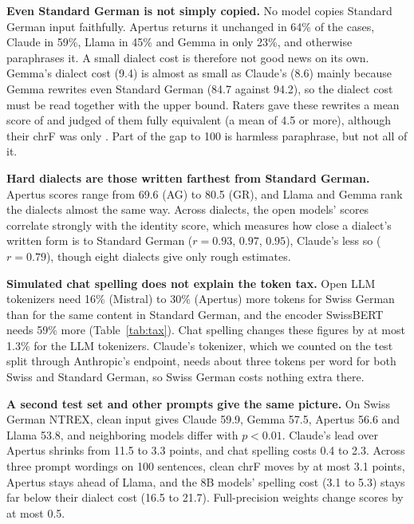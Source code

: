 \documentclass[11pt]{article}
\begin{document}
\textbf{Even Standard German is not simply copied.} No model copies Standard German input faithfully.
Apertus returns it unchanged in 64\% of the cases, Claude in 59\%, Llama in 45\% and Gemma in only
23\%, and otherwise paraphrases it. A small dialect cost is therefore not good news on its
own. Gemma's dialect cost (9.4) is almost as small as Claude's (8.6) mainly because Gemma rewrites
even Standard German (84.7 against 94.2), so the dialect cost must be read together with the upper
bound. Raters gave these rewrites a mean score of \ParaphraseRating{} and judged \ParaphraseSame{}
of them fully equivalent (a mean of 4.5 or more), although their chrF was only \ParaphraseChrf. Part
of the gap to 100 is harmless paraphrase, but not all of it.


\textbf{Hard dialects are those written farthest from Standard German.} Apertus scores range
from 69.6 (AG) to 80.5 (GR), and Llama and Gemma rank the dialects almost the same way. Across
dialects, the open models' scores correlate strongly with the identity score, which measures how close
a dialect's written form is to Standard German ($r = 0.93$, $0.97$, $0.95$), Claude's less so
($r = 0.79$), though eight dialects give only rough estimates.

\begin{table}[t]
\centering
\small
\setlength{\tabcolsep}{4pt}

\caption{Token tax: tokens for Swiss German divided by tokens for the same Standard German
sentences, dialects pooled. Range: cheapest (mostly ZH) to most expensive (BE) dialect. Texting:
change by chat spelling.}
\label{tab:tax}
\end{table}

\textbf{Simulated chat spelling does not explain the token tax.} Open LLM tokenizers need 16\%
(Mistral) to 30\% (Apertus) more tokens for Swiss German than for the same content in Standard
German, and the encoder SwissBERT needs 59\% more (Table~\ref{tab:tax}). Chat spelling changes these
figures by at most 1.3\% for the LLM tokenizers. Claude's tokenizer, which we counted on the test
split through Anthropic's endpoint, needs about three tokens per word for both Swiss and Standard
German, so Swiss German costs nothing extra there.

\textbf{A second test set and other prompts give the same picture.} On Swiss German NTREX, clean input gives Claude
59.9, Gemma 57.5, Apertus 56.6 and Llama 53.8, and neighboring models differ with $p < 0.01$.
Claude's lead over Apertus shrinks from 11.5 to 3.3 points, and chat spelling costs 0.4 to 2.3.
Across three prompt wordings on 100 sentences, clean chrF moves by at most 3.1
points, Apertus stays ahead of Llama, and the 8B models' spelling cost (3.1 to 5.3) stays far below
their dialect cost (16.5 to 21.7). Full-precision weights change scores by at most 0.5.
\end{document}
